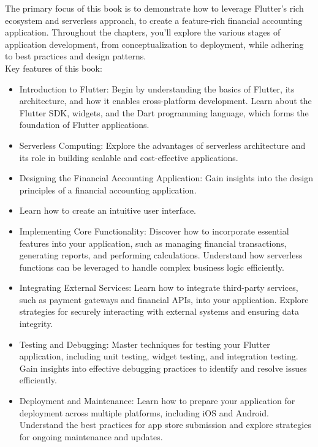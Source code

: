 The primary focus of this book is to demonstrate how to leverage Flutter's rich ecosystem and serverless approach, 
to create a feature-rich financial accounting application. Throughout the chapters, you'll explore the various 
stages of application development, from conceptualization to deployment, while adhering to best practices and 
design patterns.
\\
\noindent Key features of this book:
\begin{itemize}
    \item Introduction to Flutter: Begin by understanding the basics of Flutter, its architecture, and how it 
    enables cross-platform development. Learn about the Flutter SDK, widgets, and the Dart programming language, 
    which forms the foundation of Flutter applications.

    \item Serverless Computing: Explore the advantages of serverless architecture and its role in building 
    scalable and cost-effective applications.

    \item Designing the Financial Accounting Application: Gain insights into the design principles of a financial 
    accounting application. 
    
    \item Learn how to create an intuitive user interface.

    \item Implementing Core Functionality: Discover how to incorporate essential features into your application, 
    such as managing financial transactions, generating reports, and performing calculations. Understand how 
    serverless functions can be leveraged to handle complex business logic efficiently.

    \item Integrating External Services: Learn how to integrate third-party services, such as payment gateways 
    and financial APIs, into your application. Explore strategies for securely interacting with external 
    systems and ensuring data integrity.

    \item Testing and Debugging: Master techniques for testing your Flutter application, including unit testing, 
    widget testing, and integration testing. Gain insights into effective debugging practices to identify and 
    resolve issues efficiently.

    \item Deployment and Maintenance: Learn how to prepare your application for deployment across multiple 
    platforms, including iOS and Android. Understand the best practices for app store submission and explore 
    strategies for ongoing maintenance and updates.
\end{itemize}

